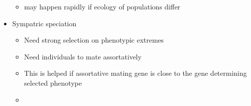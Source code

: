 \documentclass{article}
\begin{document}
\begin{itemize}
\begin{itemize}
            \item may happen rapidly if ecology of populations differ
        \end{itemize}
        \item Sympatric speciation
        \begin{itemize}
            \item Need strong selection on phenotypic extremes
            \item Need individuals to mate assortatively
            \item This is helped if assortative mating gene is close to the gene determining selected phenotype
            \item 
        \end{itemize}
    \end{itemize}
\end{document}
